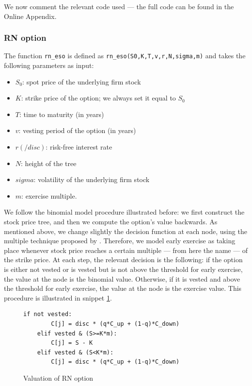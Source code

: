 We now comment the relevant code used --- the full code can be found in the Online Appendix.

\subsubsection{RN option}
The function \verb|rn_eso| is defined as \verb|rn_eso(S0,K,T,v,r,N,sigma,m)| and takes the following parameters as input:
\begin{itemize}
    \item $S_0$: spot price of the underlying firm stock
    \item $K$: strike price of the option; we always set it equal to $S_0$ %
    \item $T$: time to maturity (in years)
    \item $v$: vesting period of the option (in years)
    \item $r (/disc)$: risk-free interest rate
    \item $N$: height of the tree
    \item $sigma$: volatility of the underlying firm stock
    \item $m$: exercise multiple.
\end{itemize}

    
We follow the binomial model procedure illustrated before: we first construct the stock price tree, and then we compute the option's value backwards. As mentioned above, we change slightly the decision function at each node, using the multiple technique proposed by \cite{hull2004value}. Therefore, we model early exercise as taking place whenever stock price reaches a certain multiple --- from here the name --- of the strike price.
At each step, the relevant decision is the following: if the option is either not vested or is vested but is not above the threshold for early exercise, the value at the node is the binomial value. Otherwise, if it is vested and above the threshold for early exercise, the value at the node is the exercise value. This procedure is illustrated in snippet \ref*{fig:val_rn}.

\begin{figure}[H]
    \begin{lstlisting}[breaklines, basicstyle=\ttfamily\small]
    if not vested: 
        C[j] = disc * (q*C_up + (1-q)*C_down)
    elif vested & (S>=K*m):            
        C[j] = S - K
    elif vested & (S<K*m):
        C[j] = disc * (q*C_up + (1-q)*C_down)
    \end{lstlisting}
    \caption{Valuation of RN option}
 \label{fig:val_rn}
\end{figure}

